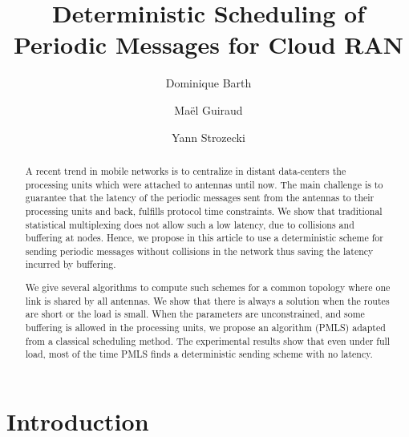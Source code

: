 \documentclass[10pt, conference, letterpaper]{IEEEtran}
\title{Deterministic Scheduling of Periodic Messages for Cloud RAN}
\author[1]{Dominique Barth}
\author[1,2]{Ma\"el Guiraud}
\author[1]{Yann Strozecki}
\affil[1]{David Laboratory, UVSQ}
\affil[2]{Nokia Bell Labs France}
\begin{document}
\maketitle

\begin{abstract}
A recent trend in mobile networks is to centralize in distant data-centers the processing units which were attached to 
antennas until now. The main challenge is to guarantee that the latency of the periodic messages sent from the antennas to their processing
units and back, fulfills protocol time constraints. We show that traditional statistical multiplexing does not allow such a low latency, due to collisions and buffering at nodes. Hence, we propose in this article to use a deterministic scheme for sending periodic messages without collisions in the network thus saving the latency incurred by buffering.

We give several algorithms to compute such schemes for a common topology where one link is shared by all antennas.
We show that there is always a solution when the routes are short or the load is small. When the parameters are unconstrained,
and some buffering is allowed in the processing units, we propose an algorithm (PMLS) adapted from a classical scheduling method.
The experimental results show that even under full load, most of the time PMLS finds a deterministic sending scheme with no latency.
\end{abstract}


\section{Introduction}
\end{document}
